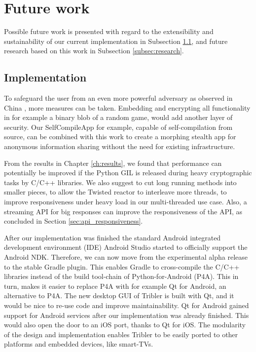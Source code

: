 \section{Future work}\label{sec:future_work}
Possible future work is presented with regard to the extensibility and sustainability of our current implementation in Subsection \ref{subsec:impl}, and future research based on this work in Subsection \ref{subsec:research}. 

\subsection{Implementation}\label{subsec:impl}
To safeguard the user from an even more powerful adversary as observed in China \cite{nyt2015china}, more measures can be taken.
Embedding and encrypting all functionality in for example a binary blob of a random game, would add another layer of security.
Our SelfCompileApp \cite{brussee2015autonomous} for example, capable of self-compilation from source, can be combined with this work to create a morphing stealth app for anonymous information sharing without the need for existing infrastructure.

From the results in Chapter \ref{ch:results}, we found that performance can potentially be improved if the Python GIL is released during heavy cryptographic tasks by C/C++ libraries.
We also suggest to cut long running methods into smaller pieces, to allow the Twisted reactor to interleave more threads, to improve responsiveness under heavy load in our multi-threaded use case.
Also, a streaming API for big responses can improve the responsiveness of the API, as concluded in Section \ref{sec:api_responsiveness}.

After our implementation was finished the standard Android integrated development environment (IDE) Android Studio started to officially support the Android NDK.
Therefore, we can now move from the experimental alpha release to the stable Gradle plugin.
This enables Gradle to cross-compile the C/C++ libraries instead of the build tool-chain of Python-for-Android (P4A).
This in turn, makes it easier to replace P4A with for example Qt for Android, an alternative to P4A.
The new desktop GUI of Tribler is built with Qt, and it would be nice to re-use code and improve maintainability.
Qt for Android gained support for Android services after our implementation was already finished.
This would also open the door to an iOS port, thanks to Qt for iOS.
The modularity of the design and implementation enables Tribler to be easily ported to other platforms and embedded devices, like smart-TVs.

